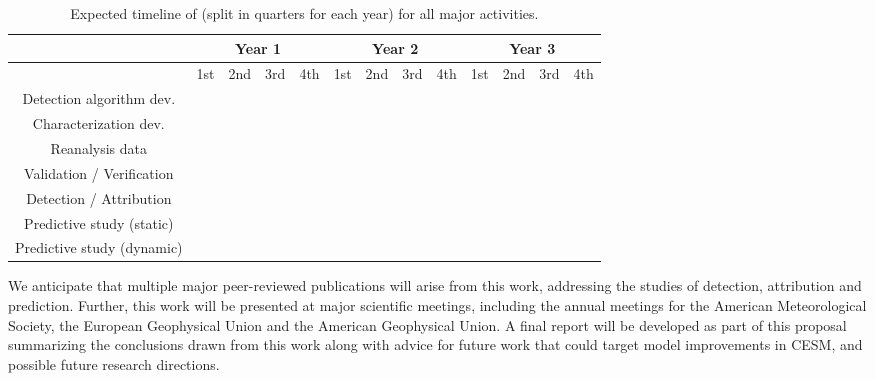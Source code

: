 \documentclass[11pt]{article}
\begin{document}
\begin{table}
\begin{tabular}{c||c|c|c|c||c|c|c|c||c|c|c|c|}
& \multicolumn{4}{c}{Year 1} & \multicolumn{4}{c}{Year 2} & \multicolumn{4}{c}{Year 3}  \\
  \hline
         & 1st & 2nd & 3rd & 4th & 1st & 2nd & 3rd & 4th  & 1st & 2nd & 3rd & 4th \\
\hline
\hline
Detection algorithm dev. & \cellcolor{red!35} & \cellcolor{red!35} & \cellcolor{red!35} & \cellcolor{red!35} & & & & & & & &  \\
\hline
Characterization dev. & \cellcolor{blue!35} & \cellcolor{blue!35} & \cellcolor{blue!35} & \cellcolor{blue!35} & & & & & & & &  \\
\hline
Reanalysis data  & \cellcolor{cyan!35} & \cellcolor{cyan!35} & \cellcolor{cyan!35} &  \cellcolor{cyan!35}  & \cellcolor{cyan!35} & \cellcolor{cyan!35} & & & & & & \\
\hline
Validation / Verification  & & & & & \cellcolor{red!35} & \cellcolor{red!35} & \cellcolor{red!35} &  \cellcolor{red!35}  & & & & \\
\hline
Detection / Attribution & & & & & \cellcolor{blue!35} & \cellcolor{blue!35} & \cellcolor{blue!35} &  \cellcolor{blue!35}  & \cellcolor{blue!35} & \cellcolor{blue!35} & & \\
\hline
Predictive study (static)  & & & & & & & \cellcolor{cyan!35} &  \cellcolor{cyan!35}  & \cellcolor{cyan!35} & \cellcolor{cyan!35} & \cellcolor{cyan!35} &  \cellcolor{cyan!35} \\
\hline
Predictive study (dynamic)  & & & & & & & & & \cellcolor{green!35} & \cellcolor{green!35} & \cellcolor{green!35} &  \cellcolor{green!35} \\
  \hline
\end{tabular}
\caption{Expected timeline of (split in quarters for each year) for all major activities.} \label{tab:ExpectedTimeline}
\end{table}

We anticipate that multiple major peer-reviewed publications will arise from this work, addressing the studies of detection, attribution and prediction. Further, this work will be presented at major scientific meetings, including the annual meetings for the American Meteorological Society, the European Geophysical Union and the American Geophysical Union.  A final report will be developed as part of this proposal summarizing the conclusions drawn from this work along with advice for future work that could target model improvements in CESM, and possible future research directions.
\end{document}
